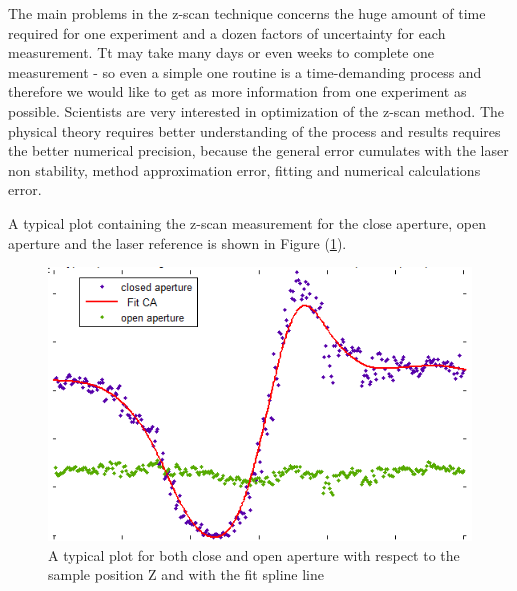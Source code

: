 \documentclass[12pt,twoside,a4paper]{article}
\numberwithin{equation}{subsection}
\numberwithin{figure}{subsection}
\begin{document}
The main problems in the z-scan technique concerns the huge amount of time required for one experiment and a dozen factors of uncertainty for each measurement. Tt may take many days or even weeks to complete one measurement - so even a simple one routine is a time-demanding process and therefore we would like to get as more information from one experiment as possible. Scientists are very interested in optimization of the z-scan method. The physical theory requires better understanding of the process and results requires the better numerical precision, because the general error cumulates with the laser non stability, method approximation error, fitting and numerical calculations error.

A typical plot containing the z-scan measurement for the close aperture, open aperture and the laser reference is shown in Figure (\ref{fig:zscan_both}).

\begin{figure} 
  \includegraphics{img/zscan_both.png}
  \caption{A typical plot for both close and open aperture with respect to the sample position Z and with the fit spline line \label{fig:zscan_both}} 
\end{figure}
\end{document}
